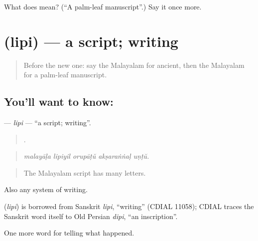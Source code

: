 \begin{tcolorbox}[breakable,colback=teal!4,colframe=teal!35!black,title={Before you move on}]
What does  mean? (\textquotedblleft{}A palm-leaf manuscript\textquotedblright{}.) Say it once more.
\end{tcolorbox}
\section[\texorpdfstring{\ml{ലിപി} (lipi)}{ലിപി (lipi)}]{ (lipi) — a script; writing}

\label{lesson:ML-C404-lipi}



\begin{quote}
Before the new one: say the Malayalam for ancient, then the Malayalam for a palm-leaf manuscript.
\end{quote}

\subsection*{You'll want to know: }
\textbf{} — \emph{lipi} — \textquotedblleft{}a script; writing\textquotedblright{}.

\begin{quote}
    .
\end{quote}

\begin{quote}
\emph{malayāḷa lipiyil orupāṭŭ akṣaraṅṅaḷ uṇṭŭ.}
\end{quote}

\begin{quote}
The Malayalam script has many letters.
\end{quote}

Also any system of writing.

\begin{cousinweb}
\textbf{} (\emph{lipi}) is borrowed from Sanskrit \emph{lipi}, \textquotedblleft{}writing\textquotedblright{} (CDIAL 11058); CDIAL traces the Sanskrit word itself to Old Persian \emph{dipi}, \textquotedblleft{}an inscription\textquotedblright{}.
\end{cousinweb}

\begin{grammarlens}[title={What you've built}]
One more word for telling what happened.
\end{grammarlens}


